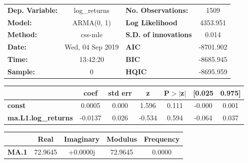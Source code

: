 \begin{center}
\begin{tabular}{lclc}
\toprule
\textbf{Dep. Variable:}     &        log\_returns       & \textbf{  No. Observations:  } &            1509            \\
\textbf{Model:}             &         ARMA(0, 1)        & \textbf{  Log Likelihood     } &          4353.951          \\
\textbf{Method:}            &          css-mle          & \textbf{  S.D. of innovations} &           0.014            \\
\textbf{Date:}              &      Wed, 04 Sep 2019     & \textbf{  AIC                } &         -8701.902          \\
\textbf{Time:}              &          13:42:20         & \textbf{  BIC                } &         -8685.945          \\
\textbf{Sample:}            &             0             & \textbf{  HQIC               } &         -8695.959          \\
\bottomrule
\end{tabular}
\begin{tabular}{lcccccc}
                            & \textbf{coef} & \textbf{std err} & \textbf{z} & \textbf{P$> |$z$|$} & \textbf{[0.025} & \textbf{0.975]}  \\
\midrule
\textbf{const}              &       0.0005  &        0.000     &     1.596  &         0.111        &       -0.000    &        0.001     \\
\textbf{ma.L1.log\_returns} &      -0.0137  &        0.026     &    -0.534  &         0.594        &       -0.064    &        0.037     \\
\bottomrule
\end{tabular}
\begin{tabular}{lcccc}
              & \textbf{            Real} & \textbf{         Imaginary} & \textbf{         Modulus} & \textbf{        Frequency}  \\
\midrule
\textbf{MA.1} &               72.9645     &                +0.0000j     &               72.9645     &                0.0000       \\
\bottomrule
\end{tabular}
\end{center}
